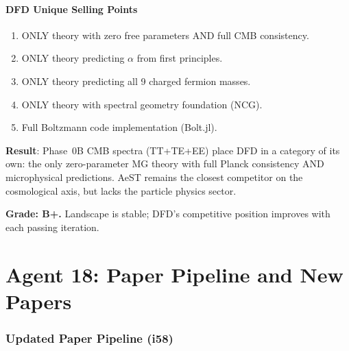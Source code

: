 \documentclass[11pt,a4paper]{article}
\begin{document}
\subsection{DFD Unique Selling Points}

\begin{enumerate}
\item ONLY theory with zero free parameters AND full CMB consistency.
\item ONLY theory predicting $\alpha$ from first principles.
\item ONLY theory predicting all 9 charged fermion masses.
\item ONLY theory with spectral geometry foundation (NCG).
\item Full Boltzmann code implementation (Bolt.jl).
\end{enumerate}

\begin{tcolorbox}[colback=green!5!white, colframe=green!60!black, title={Agent 17: Competition --- DFD POSITION STRENGTHENED}]
\textbf{Result}: Phase~0B CMB spectra (TT+TE+EE) place DFD in a category of its own: the only zero-parameter MG theory with full Planck consistency AND microphysical predictions. AeST remains the closest competitor on the cosmological axis, but lacks the particle physics sector.

\textbf{Grade: B+.} Landscape is stable; DFD's competitive position improves with each passing iteration.
\end{tcolorbox}


\part{Agent 18: Paper Pipeline and New Papers}
\label{part:papers}

\section{Updated Paper Pipeline (i58)}
\end{document}
